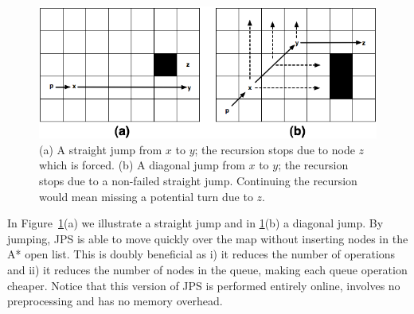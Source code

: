 \begin{figure}[tb]
       \begin{center}
		   \includegraphics[width=0.95\columnwidth]
			{diagrams/jumping.png}
       \end{center}
	\vspace{-3pt}
       \caption{(a) A straight jump from $x$ to $y$; the recursion stops due to node $z$ which is forced.
(b) A diagonal jump from $x$ to $y$; the recursion stops due to a non-failed straight jump. Continuing the recursion
would mean missing a potential turn due to $z$.}
       \label{fig:jumping}
\end{figure}

In Figure~\ref{fig:jumping}(a) we illustrate a straight jump and in \ref{fig:jumping}(b) a diagonal jump. 
By jumping, JPS is able to move quickly over the map 
without inserting nodes in the A* open list.
This is doubly beneficial as i) it reduces the number of operations 
and ii) it reduces the number of nodes in the queue, 
making each queue operation cheaper.  
Notice that this version of JPS is performed entirely online, involves no preprocessing and has no memory overhead.  

